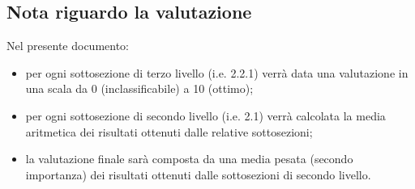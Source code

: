 \subsection{Nota riguardo la valutazione}
Nel presente documento:
\begin{itemize}
	\item per ogni sottosezione di terzo livello (i.e. 2.2.1) 
	verrà data una valutazione in una scala da 0 (inclassificabile) a 10 (ottimo);
	\item per ogni sottosezione di secondo livello (i.e. 2.1) verrà calcolata
	la media aritmetica dei risultati ottenuti dalle relative sottosezioni;
	\item la valutazione finale sarà composta da una media pesata 
	(secondo importanza) dei risultati ottenuti dalle sottosezioni di secondo 
	livello.
\end{itemize}